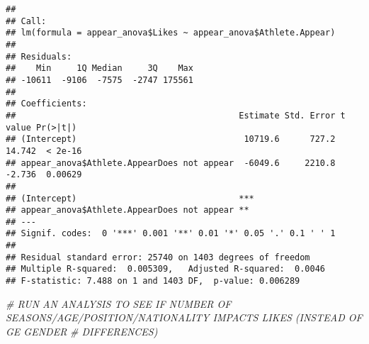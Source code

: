 \documentclass[
]{article}
\newenvironment{Shaded}{\begin{snugshade}}{\end{snugshade}}
\newcommand{\AttributeTok}[1]{\textcolor[rgb]{0.77,0.63,0.00}{#1}}
\newcommand{\CommentTok}[1]{\textcolor[rgb]{0.56,0.35,0.01}{\textit{#1}}}
\newcommand{\FunctionTok}[1]{\textcolor[rgb]{0.00,0.00,0.00}{#1}}
\newcommand{\NormalTok}[1]{#1}
\newcommand{\OtherTok}[1]{\textcolor[rgb]{0.56,0.35,0.01}{#1}}
\newcommand{\SpecialCharTok}[1]{\textcolor[rgb]{0.00,0.00,0.00}{#1}}
\newcommand{\StringTok}[1]{\textcolor[rgb]{0.31,0.60,0.02}{#1}}
\begin{document}
\begin{Shaded}
\end{Shaded}

\begin{verbatim}
## 
## Call:
## lm(formula = appear_anova$Likes ~ appear_anova$Athlete.Appear)
## 
## Residuals:
##    Min     1Q Median     3Q    Max 
## -10611  -9106  -7575  -2747 175561 
## 
## Coefficients:
##                                            Estimate Std. Error t value Pr(>|t|)
## (Intercept)                                 10719.6      727.2  14.742  < 2e-16
## appear_anova$Athlete.AppearDoes not appear  -6049.6     2210.8  -2.736  0.00629
##                                               
## (Intercept)                                ***
## appear_anova$Athlete.AppearDoes not appear ** 
## ---
## Signif. codes:  0 '***' 0.001 '**' 0.01 '*' 0.05 '.' 0.1 ' ' 1
## 
## Residual standard error: 25740 on 1403 degrees of freedom
## Multiple R-squared:  0.005309,   Adjusted R-squared:  0.0046 
## F-statistic: 7.488 on 1 and 1403 DF,  p-value: 0.006289
\end{verbatim}

\begin{Shaded}
\begin{Highlighting}[]
\CommentTok{\# RUN AN ANALYSIS TO SEE IF NUMBER OF SEASONS/AGE/POSITION/NATIONALITY IMPACTS LIKES (INSTEAD OF GE GENDER}
\CommentTok{\# DIFFERENCES)}
\end{Highlighting}
\end{Shaded}

\begin{Shaded}
\end{Shaded}
\end{document}
